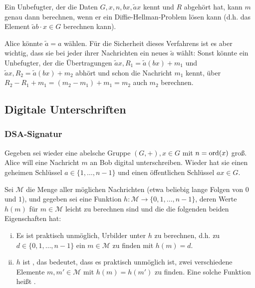 \begin{bem}
	Ein Unbefugter, der die Daten $G, x, n, bx, \tilde{a}x$ kennt und $R$ abgehört hat, kann $m$ genau dann berechnen, wenn er ein Diffie-Hellman-Problem lösen kann (d.h. das Element $\tilde{a}b \cdot x \in G$ berechnen kann).
\end{bem}

\begin{bem}
	Alice könnte $\tilde{a} = a$ wählen. Für die Sicherheit dieses Verfahrens ist es aber wichtig, dass sie bei jeder ihrer Nachrichten ein neues $\tilde{a}$ wählt: Sonst könnte ein Unbefugter, der die Übertragungen $\tilde{a}x, R_1 = \tilde{a}(bx) + m_1$ und $\tilde{a}x, R_2 = \tilde{a}(bx) + m_2$ abhört und schon die Nachricht $m_1$ kennt, über $R_2 - R_1 + m_1 = (m_2 - m_1) + m_1 = m_2$ auch $m_2$ berechnen.
\end{bem}

\newpage
\subsection{Digitale Unterschriften}
\subsubsection{DSA-Signatur}
\label{sub:1.3}
\label{subsub:1.3.1}
	Gegeben sei wieder eine abelsche Gruppe $(G,+), x \in G$ mit $n = \operatorname{ord}(x)$ groß. Alice will eine Nachricht $m$ an Bob digital unterschreiben. Wieder hat sie einen geheimen Schlüssel $a \in \{1, \dots, n-1\}$ und einen öffentlichen Schlüssel $ax \in G$.
	
\begin{defn}[Hashfunktion]
	Sei $\mathcal{M}$ die Menge aller möglichen Nachrichten (etwa beliebig lange Folgen von $0$ und $1$), und gegeben sei eine Funktion $h \colon \mathcal{M} \rightarrow \{0,1,\dots,n-1\}$, deren Werte $h(m)$ für $m \in \mathcal{M}$ leicht zu berechnen sind und die die folgenden beiden Eigenschaften hat:
	\begin{enumerate}[(i)]
		\item Es ist praktisch unmöglich, Urbilder unter $h$ zu berechnen, d.h. zu $d \in \{0,1,\dots,n-1\}$ ein $m \in \mathcal{M}$ zu finden mit $h(m) = d$.
		\item $h$ ist , das bedeutet, dass es praktisch unmöglich ist, zwei verschiedene Elemente $m, m' \in \mathcal{M}$ mit $h(m) = h(m')$ zu finden. Eine solche Funktion heißt .
	\end{enumerate}
\end{defn}

